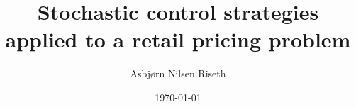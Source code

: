 \documentclass[a4paper,12pt]{article}
\title{Stochastic control strategies applied to a retail
  pricing problem}
\author{Asbj{\o}rn Nilsen Riseth}
\date{\today}
\def\biblio{}
\begin{document}
\maketitle
\listoftodos

\def\biblio{}
\def\listoftodos{}






% 


\clearpage


\end{document}

